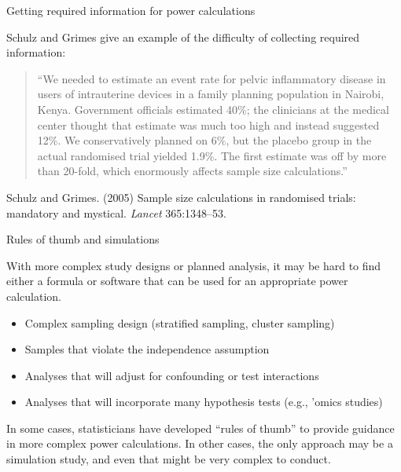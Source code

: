 \documentclass[ignorenonframetext,]{beamer}
\providecommand{\tightlist}{%
  \setlength{\itemsep}{0pt}\setlength{\parskip}{0pt}}
\begin{document}
\begin{frame}{Getting required information for power calculations}

Schulz and Grimes give an example of the difficulty of collecting
required information:

\begin{quote}
``We needed to estimate an event rate for pelvic inflammatory disease in
users of intrauterine devices in a family planning population in
Nairobi, Kenya. Government officials estimated 40\%; the clinicians at
the medical center thought that estimate was much too high and instead
suggested 12\%. We conservatively planned on 6\%, but the placebo group
in the actual randomised trial yielded 1.9\%. The first estimate was off
by more than 20-fold, which enormously affects sample size
calculations.''
\end{quote}

\footnotesize{Schulz and Grimes. (2005) Sample size calculations in randomised trials: mandatory and mystical. \textit{Lancet} 365:1348--53.}

\end{frame}

\begin{frame}{Rules of thumb and simulations}

With more complex study designs or planned analysis, it may be hard to
find either a formula or software that can be used for an appropriate
power calculation.

\begin{itemize}
\tightlist
\item
  Complex sampling design (stratified sampling, cluster sampling)
\item
  Samples that violate the independence assumption
\item
  Analyses that will adjust for confounding or test interactions
\item
  Analyses that will incorporate many hypothesis tests (e.g., 'omics
  studies)
\end{itemize}

In some cases, statisticians have developed ``rules of thumb'' to
provide guidance in more complex power calculations. In other cases, the
only approach may be a simulation study, and even that might be very
complex to conduct.

\end{frame}
\end{document}
